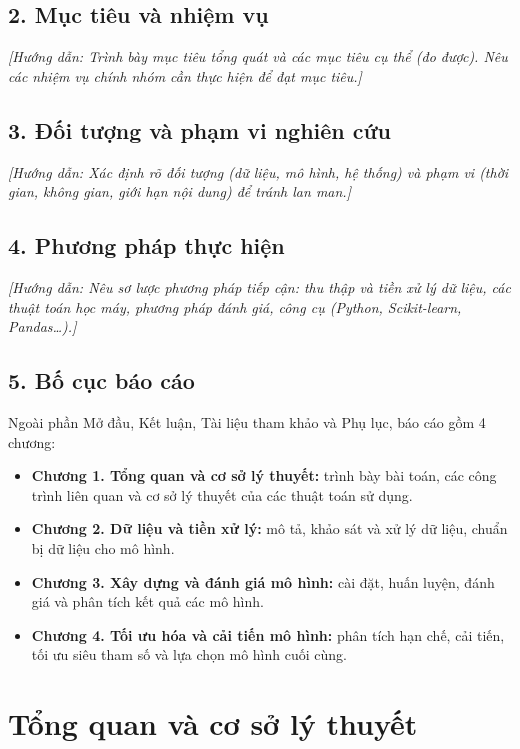 \documentclass[12pt,a4paper,oneside]{report}
\newcommand{\huongdan}[1]{{\color{guide}\itshape [Hướng dẫn: #1]}}
\begin{document}
\section*{2. Mục tiêu và nhiệm vụ}
\huongdan{Trình bày mục tiêu tổng quát và các mục tiêu cụ thể (đo được). Nêu
các nhiệm vụ chính nhóm cần thực hiện để đạt mục tiêu.}

\section*{3. Đối tượng và phạm vi nghiên cứu}
\huongdan{Xác định rõ đối tượng (dữ liệu, mô hình, hệ thống) và phạm vi
(thời gian, không gian, giới hạn nội dung) để tránh lan man.}

\section*{4. Phương pháp thực hiện}
\huongdan{Nêu sơ lược phương pháp tiếp cận: thu thập và tiền xử lý dữ liệu,
các thuật toán học máy, phương pháp đánh giá, công cụ (Python, Scikit-learn,
Pandas\dots).}

\section*{5. Bố cục báo cáo}
Ngoài phần Mở đầu, Kết luận, Tài liệu tham khảo và Phụ lục, báo cáo gồm
4 chương:
\begin{itemize}
  \item \textbf{Chương 1. Tổng quan và cơ sở lý thuyết:} trình bày bài toán,
        các công trình liên quan và cơ sở lý thuyết của các thuật toán sử dụng.
  \item \textbf{Chương 2. Dữ liệu và tiền xử lý:} mô tả, khảo sát và xử lý
        dữ liệu, chuẩn bị dữ liệu cho mô hình.
  \item \textbf{Chương 3. Xây dựng và đánh giá mô hình:} cài đặt, huấn luyện,
        đánh giá và phân tích kết quả các mô hình.
  \item \textbf{Chương 4. Tối ưu hóa và cải tiến mô hình:} phân tích hạn chế,
        cải tiến, tối ưu siêu tham số và lựa chọn mô hình cuối cùng.
\end{itemize}

\chapter{Tổng quan và cơ sở lý thuyết}
\label{chap:tongquan}
\end{document}
